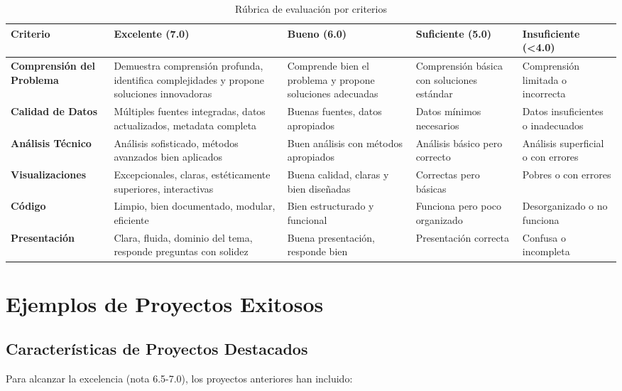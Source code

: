 \documentclass[11pt,letterpaper]{article}
\begin{document}
\begin{table}[H]
\centering
\small
\begin{tabularx}{\textwidth}{|l|X|X|X|X|}
\hline
\rowcolor{usachblue!20}
\textbf{Criterio} & \textbf{Excelente (7.0)} & \textbf{Bueno (6.0)} & \textbf{Suficiente (5.0)} & \textbf{Insuficiente (<4.0)} \\
\hline
\textbf{Comprensión del Problema} &
Demuestra comprensión profunda, identifica complejidades y propone soluciones innovadoras &
Comprende bien el problema y propone soluciones adecuadas &
Comprensión básica con soluciones estándar &
Comprensión limitada o incorrecta \\
\hline
\textbf{Calidad de Datos} &
Múltiples fuentes integradas, datos actualizados, metadata completa &
Buenas fuentes, datos apropiados &
Datos mínimos necesarios &
Datos insuficientes o inadecuados \\
\hline
\textbf{Análisis Técnico} &
Análisis sofisticado, métodos avanzados bien aplicados &
Buen análisis con métodos apropiados &
Análisis básico pero correcto &
Análisis superficial o con errores \\
\hline
\textbf{Visualizaciones} &
Excepcionales, claras, estéticamente superiores, interactivas &
Buena calidad, claras y bien diseñadas &
Correctas pero básicas &
Pobres o con errores \\
\hline
\textbf{Código} &
Limpio, bien documentado, modular, eficiente &
Bien estructurado y funcional &
Funciona pero poco organizado &
Desorganizado o no funciona \\
\hline
\textbf{Presentación} &
Clara, fluida, dominio del tema, responde preguntas con solidez &
Buena presentación, responde bien &
Presentación correcta &
Confusa o incompleta \\
\hline
\end{tabularx}
\caption{Rúbrica de evaluación por criterios}
\end{table}

\section{Ejemplos de Proyectos Exitosos}

\subsection{Características de Proyectos Destacados}

Para alcanzar la excelencia (nota 6.5-7.0), los proyectos anteriores han incluido:
\end{document}

